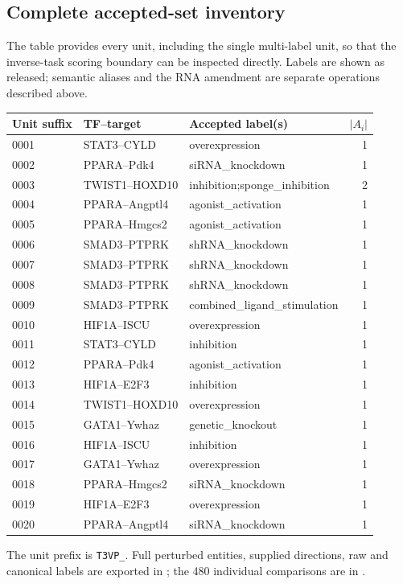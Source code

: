 \subsection*{Complete accepted-set inventory}
The table provides every unit, including the single multi-label unit, so that the inverse-task scoring boundary can be inspected directly. Labels are shown as released; semantic aliases and the RNA amendment are separate operations described above.
\begin{center}
\small
\begin{tabularx}{\linewidth}{@{}l l X r@{}}
\toprule
Unit suffix & TF--target & Accepted label(s) & $|A_i|$ \\
\midrule
0001 & STAT3--CYLD & overexpression & 1 \\
0002 & PPARA--Pdk4 & siRNA\_knockdown & 1 \\
0003 & TWIST1--HOXD10 & inhibition;\allowbreak sponge\_inhibition & 2 \\
0004 & PPARA--Angptl4 & agonist\_activation & 1 \\
0005 & PPARA--Hmgcs2 & agonist\_activation & 1 \\
0006 & SMAD3--PTPRK & shRNA\_knockdown & 1 \\
0007 & SMAD3--PTPRK & shRNA\_knockdown & 1 \\
0008 & SMAD3--PTPRK & shRNA\_knockdown & 1 \\
0009 & SMAD3--PTPRK & combined\_ligand\_stimulation & 1 \\
0010 & HIF1A--ISCU & overexpression & 1 \\
0011 & STAT3--CYLD & inhibition & 1 \\
0012 & PPARA--Pdk4 & agonist\_activation & 1 \\
0013 & HIF1A--E2F3 & inhibition & 1 \\
0014 & TWIST1--HOXD10 & overexpression & 1 \\
0015 & GATA1--Ywhaz & genetic\_knockout & 1 \\
0016 & HIF1A--ISCU & inhibition & 1 \\
0017 & GATA1--Ywhaz & overexpression & 1 \\
0018 & PPARA--Hmgcs2 & siRNA\_knockdown & 1 \\
0019 & HIF1A--E2F3 & overexpression & 1 \\
0020 & PPARA--Angptl4 & siRNA\_knockdown & 1 \\
\bottomrule
\end{tabularx}
\end{center}
The unit prefix is \texttt{T3VP\_}. Full perturbed entities, supplied directions, raw and canonical labels are exported in ; the 480 individual comparisons are in .

